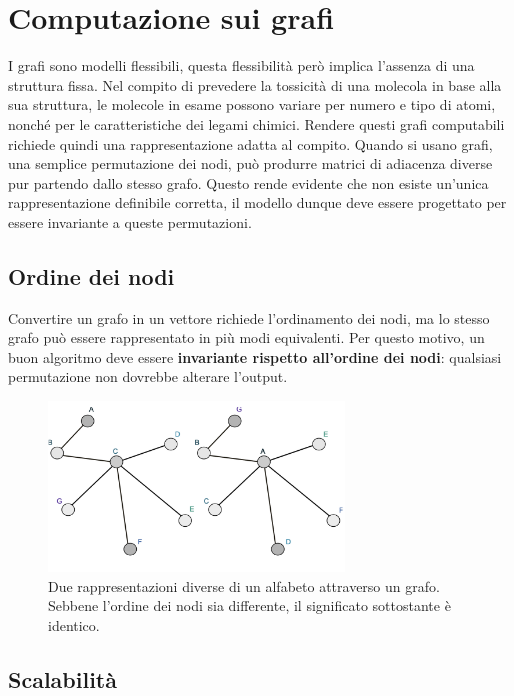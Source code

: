 \section{Computazione sui grafi}

I grafi sono modelli flessibili, questa flessibilità però implica l’assenza di una struttura fissa. Nel compito di prevedere la tossicità di una molecola in base alla sua struttura, le molecole in esame possono variare per numero e tipo di atomi, nonché per le caratteristiche dei legami chimici. Rendere questi grafi computabili richiede quindi una rappresentazione adatta al compito. Quando si usano grafi, una semplice permutazione dei nodi, può produrre matrici di adiacenza diverse pur partendo dallo stesso grafo. Questo rende evidente che non esiste un’unica rappresentazione definibile corretta, il modello dunque deve essere progettato per essere invariante a queste permutazioni.

\subsection{Ordine dei nodi}

Convertire un grafo in un vettore richiede l'ordinamento dei nodi, ma lo stesso grafo può essere rappresentato in più modi equivalenti. Per questo motivo, un buon algoritmo deve essere \textbf{invariante rispetto all’ordine dei nodi}: qualsiasi permutazione non dovrebbe alterare l’output.
\begin{figure}
    \centering
    \includegraphics[width=0.7\textwidth]{figure/OrderNode}
    \caption{Due rappresentazioni diverse di un alfabeto attraverso un grafo. Sebbene l’ordine dei nodi sia differente, il significato sottostante è identico.}
    \label{fig:ordNode}
\end{figure}

\subsection{Scalabilità}

